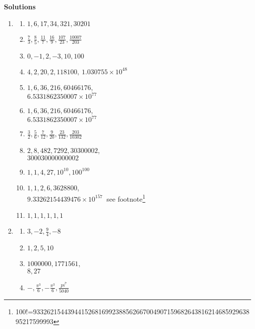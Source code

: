 \documentclass[11pt,a4paper,titlepage,oneside,openany]{article}
\numberwithin{equation}{section}
\numberwithin{algorithm}{section}
\numberwithin{figure}{section}
\numberwithin{table}{section}
\begin{document}
\begin{center}
\textbf{Solutions}
\end{center}
\begin{enumerate}
\item   \begin{multicols}{2}
    \begin{enumerate}
    \item $1,6,17,34,321,30201$
    \item $\frac{7}{3},\frac{8}{5},\frac{11}{7},\frac{16}{9},\frac{107}{23},\frac{10007}{203}$
    \item $0,-1,2,-3,10,100$
    \item $4,2,20,2,118100,~1.030755\times 10^{48}$
    \item $1,6,36,216,60466176$,\\$6.5331862350007\times 10^{77}$
    \item $1,6,36,216,60466176$,\\$6.5331862350007\times 10^{77}$
    \item $\frac{3}{2},\frac{5}{6},\frac{7}{12},\frac{9}{20},\frac{23}{132},\frac{203}{10302}$
    \item $2,8,482,7292,30300002$,\\$300030000000002$
    \item $1,1,4,27,10^{10},100^{100}$
    \item $1,1,2,6,3628800$, \\$9.33262154439476\times 10^{157}\ $ see footnote\footnote{100!=93326215443944152681699238856266700490715968264381621468592963895217599993}
    \item $1,1,1,1,1,1$
    \end{enumerate}        
  \end{multicols}

\item   \begin{multicols}{2}
    \begin{enumerate}
    \item $3,-2,\frac{9}{4},-8$
    \item $1,2,5,10$
\columnbreak
    \item $1000000,1771561$,\\$8,27$
    \item $-,\frac{\pi^3}{6},-\frac{\pi^3}{6},\frac{pi^7}{5040}$
    \end{enumerate}        
  \end{multicols}


\end{enumerate}
\end{document}

